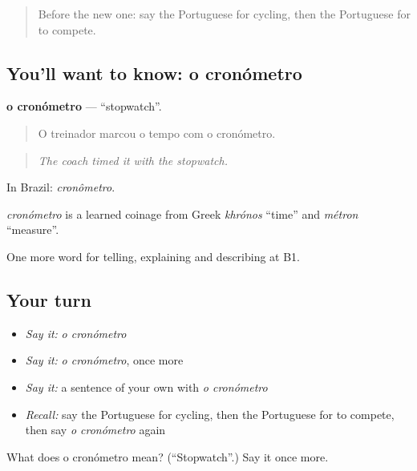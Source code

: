 \label{lesson:PT-C513-cronometro}



\begin{quote}
Before the new one: say the Portuguese for cycling, then the Portuguese for to compete.
\end{quote}

\subsection*{You'll want to know: o cronómetro}
\textbf{o cronómetro} — \textquotedblleft{}stopwatch\textquotedblright{}.

\begin{quote}
O treinador marcou o tempo com o cronómetro.
\end{quote}

\begin{quote}
\emph{The coach timed it with the stopwatch.}
\end{quote}

In Brazil: \emph{cronômetro}.

\begin{cousinweb}
\emph{cronómetro} is a learned coinage from Greek \emph{khrónos} \textquotedblleft{}time\textquotedblright{} and \emph{métron} \textquotedblleft{}measure\textquotedblright{}.
\end{cousinweb}

\begin{grammarlens}[title={What you've built}]
One more word for telling, explaining and describing at B1.
\end{grammarlens}

\subsection*{Your turn}
\begin{itemize}
\raggedright
  \item \emph{Say it:} \emph{o cronómetro}
  \item \emph{Say it:} \emph{o cronómetro}, once more
  \item \emph{Say it:} a sentence of your own with \emph{o cronómetro}
  \item \emph{Recall:} say the Portuguese for cycling, then the Portuguese for to compete, then say \emph{o cronómetro} again
\end{itemize}

\begin{tcolorbox}[breakable,colback=teal!4,colframe=teal!35!black,title={Before you move on}]
What does o cronómetro mean? (\textquotedblleft{}Stopwatch\textquotedblright{}.) Say it once more.
\end{tcolorbox}
